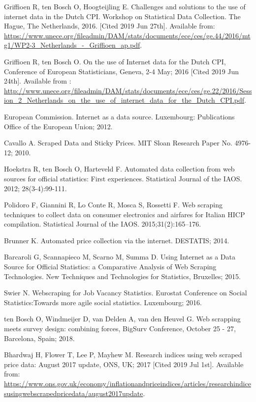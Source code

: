 \documentclass[]{article}
\begin{document}
\begin{thebibliography}{99}
Griffioen R, ten Bosch O, Hoogteijling E. Challenges and solutions to the use of internet data in the Dutch CPI. 
Workshop on Statistical Data Collection. The Hague, The Netherlands, 2016. [Cited 2019 Jun 27th]. Available from: \url{https://www.unece.org/fileadmin/DAM/stats/documents/ece/ces/ge.44/2016/mtg1/WP2-3_Netherlands_-_Griffioen_ap.pdf}.

Griffioen R, ten Bosch O. On the use of Internet data for the Dutch CPI,
Conference of European Statisticians, Geneva, 2-4 May; 2016 [Cited 2019 Jun 24th]. Available from : \url{http://www.unece.org/fileadmin/DAM/stats/documents/ece/ces/ge.22/2016/Session_2_Netherlands_on_the_use_of_internet_data_for_the_Dutch_CPI.pdf}.

European Commission. Internet as a data source. Luxembourg: Publications Office of the European Union; 2012.

Cavallo A. Scraped Data and Sticky Prices. MIT Sloan Research Paper No. 4976-12; 2010.

Hoekstra R, ten Bosch O, Harteveld F. Automated data collection from web sources for official statistics: First experiences. 
Statistical Journal of the IAOS. 2012; 28(3-4):99-111.

Polidoro F, Giannini R, Lo Conte R, Mosca S, Rossetti F. Web scraping techniques to collect data on consumer electronics and airfares for Italian HICP compilation. Statistical Journal of the IAOS. 2015;31(2):165–176.

Brunner K. Automated price collection via the internet. DESTATIS; 2014.

Barcaroli G, Scannapieco M, Scarno M, Summa D. Using Internet as a Data Source for Official Statistics: a Comparative Analysis of Web Scraping Technologies.
New Techniques and Technologies for Statistics, Bruxelles; 2015.

Swier N. Webscraping for Job Vacancy Statistics. Eurostat Conference on Social Statistics:Towards more agile social statistics. Luxembourg; 2016.

ten Bosch O, Windmeijer D, van Delden A, van den Heuvel G. Web scrapping meets survey design: combining forces,
BigSurv Conference, October 25 - 27, Barcelona, Spain; 2018.

Bhardwaj H, Flower T, Lee P, Mayhew M. Research indices using web scraped price data: August 2017 update, ONS, UK; 2017 [Cited 2019 Jul 1st]. Available from:
\url{https://www.ons.gov.uk/economy/inflationandpriceindices/articles/researchindicesusingwebscrapedpricedata/august2017update}.


\end{thebibliography}
\end{document}
